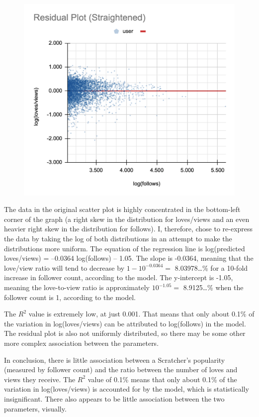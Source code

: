 \documentclass[12pt]{article}
\begin{document}
\begin{flushleft}
	\newpage
	\begin{figure}[h]
		\includegraphics[width=\linewidth]{img/plot3.png}
		\centering
	\end{figure}
	
	\newpage
	The data in the original scatter plot is highly concentrated in the bottom-left corner of the graph (a right skew in the distribution for loves/views and an even heavier right skew in the distribution for follows). I, therefore, chose to re-express the data by taking the log of both distributions in an attempt to make the distributions more uniform. The equation of the regression line is log(predicted loves/views) = –0.0364 log(follows) – 1.05. The slope is -0.0364, meaning that the love/view ratio will tend to decrease by $1-10^{-0.0364}=$ 8.03978…\% for a 10-fold increase in follower count, according to the model. The y-intercept is -1.05, meaning the love-to-view ratio is approximately $10^{-1.05}=$ 8.9125…\% when the follower count is 1, according to the model.
	
	The $R^2$ value is extremely low, at just 0.001. That means that only about 0.1\% of the variation in log(loves/views) can be attributed to log(follows) in the model. The residual plot is also not uniformly distributed, so there may be some other more complex association between the parameters.
	
	In conclusion, there is little association between a Scratcher’s popularity (measured by follower count) and the ratio between the number of loves and views they receive. The $R^2$ value of 0.1\% means that only about 0.1\% of the variation in log(loves/views) is accounted for by the model, which is statistically insignificant. There also appears to be little association between the two parameters, visually.
	
\end{flushleft}
\end{document}
